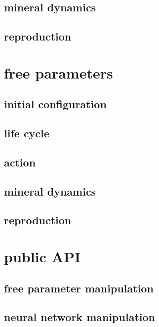 \documentclass{amsart}
\theoremstyle{definition}
\theoremstyle{remark}
\numberwithin{equation}{section}
\begin{document}
\subsection{mineral dynamics}


\subsection{reproduction}  

\section{free parameters}
\subsection{initial configuration}

\subsection{life cycle}

\subsection{action}

\subsection{mineral dynamics}

\subsection{reproduction}

\section{public API}

\subsection{free parameter manipulation}

\subsection{neural network manipulation}
\end{document}
